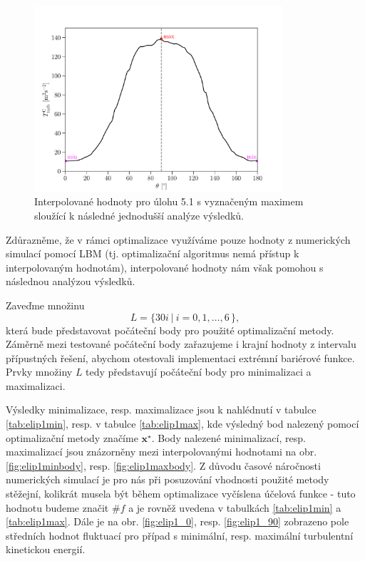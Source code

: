 \begin{figure}[H]
	\centering
	\vspace{-2mm}
	\includegraphics[width=0.82\textwidth]{Images/elip1interpolated.pdf}
	\vspace{2mm}
	\caption{Interpolované hodnoty pro úlohu 5.1 s vyznačeným maximem sloužící k následné jednodušší analýze výsledků.}
	\label{fig:interpolovana elipsa 1}
	\vspace{1.8mm}
\end{figure}

Zdůrazněme, že v rámci optimalizace využíváme pouze hodnoty z numerických simulací pomocí LBM (tj. optimalizační algoritmus nemá přístup k interpolovaným hodnotám), interpolované hodnoty nám však pomohou s následnou analýzou výsledků.

Zaveďme množinu
\begin{equation}\label{mnozina poc bodu}
	L = \big\{ 30 i \: | \: i = 0, 1, \dots, 6 \, \big\},
\end{equation}
která bude představovat počáteční body pro použité optimalizační metody. Záměrně mezi testované počáteční body zařazujeme i krajní hodnoty z intervalu přípustných řešení, abychom otestovali implementaci extrémní bariérové funkce. Prvky množiny $ L $ tedy představují počáteční body pro minimalizaci a maximalizaci.

Výsledky minimalizace, resp. maximalizace jsou k nahlédnutí v tabulce \ref{tab:elip1min}, resp. v tabulce \ref{tab:elip1max}, kde výsledný bod nalezený pomocí optimalizační metody značíme $\mathbf{x^\star}$. Body nalezené minimalizací, resp. maximalizací jsou znázorněny mezi interpolovanými hodnotami na obr. \ref{fig:elip1minbody}, resp. \ref{fig:elip1maxbody}. Z důvodu časové náročnosti numerických simulací je pro nás při posuzování vhodnosti použité metody stěžejní, kolikrát musela být během optimalizace vyčíslena účelová funkce - tuto hodnotu budeme značit $ \# f$ a je rovněž uvedena v tabulkách \ref{tab:elip1min} a \ref{tab:elip1max}. Dále je na obr. \ref{fig:elip1_0}, resp. \ref{fig:elip1_90} zobrazeno pole středních hodnot fluktuací pro případ s minimální, resp. maximální turbulentní kinetickou energií.

